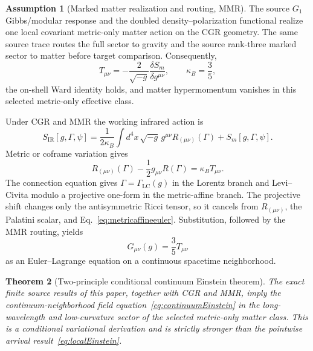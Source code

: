 \documentclass[11pt]{article}
\newtheorem{theorem}{Theorem}[section]
\theoremstyle{definition}
\newtheorem{assumption}[theorem]{Assumption}
\theoremstyle{remark}
\begin{document}
\begin{assumption}[Marked matter realization and routing, MMR]\label{ass:mmr}
The source $G_1$ Gibbs/modular response and the doubled density--polarization functional realize one local covariant metric-only matter action on the CGR geometry. The same source trace routes the full sector to gravity and the source rank-three marked sector to matter before target comparison. Consequently,
\begin{equation}\label{eq:matterstress}
 T_{\mu\nu}=-\frac{2}{\sqrt{-g}}\frac{\delta S_m}{\delta g^{\mu\nu}},
 \qquad \kappa_B=\frac35,
\end{equation}
the on-shell Ward identity holds, and matter hypermomentum vanishes in this selected metric-only effective class.
\end{assumption}

Under CGR and MMR the working infrared action is
\begin{equation}\label{eq:continuumaction}
 S_{\mathrm{IR}}[g,\Gamma,\psi]
 =\frac{1}{2\kappa_B}\int d^4x\,\sqrt{-g}\,
   g^{\mu\nu}R_{(\mu\nu)}(\Gamma)
 +S_m[g,\Gamma,\psi].
\end{equation}
Metric or coframe variation gives
\begin{equation}\label{eq:metricaffineeuler}
 R_{(\mu\nu)}(\Gamma)-\frac12g_{\mu\nu}R(\Gamma)
 =\kappa_B T_{\mu\nu}.
\end{equation}
The connection equation gives $\Gamma=\Gamma_{\mathrm{LC}}(g)$ in the Lorentz branch and Levi--Civita modulo a projective one-form in the metric-affine branch. The projective shift changes only the antisymmetric Ricci tensor, so it cancels from $R_{(\mu\nu)}$, the Palatini scalar, and Eq.~\eqref{eq:metricaffineeuler}. Substitution, followed by the MMR routing, yields
\begin{equation}\label{eq:continuumEinstein}
 \boxed{G_{\mu\nu}(g)=\frac35T_{\mu\nu}}
\end{equation}
as an Euler--Lagrange equation on a continuous spacetime neighborhood.

\begin{theorem}[Two-principle conditional continuum Einstein theorem]\label{thm:conditionalEinstein}
The exact finite source results of this paper, together with CGR and MMR, imply the continuum-neighborhood field equation~\eqref{eq:continuumEinstein} in the long-wavelength and low-curvature sector of the selected metric-only matter class. This is a conditional variational derivation and is strictly stronger than the pointwise arrival result~\eqref{eq:localEinstein}.
\end{theorem}
\end{document}
